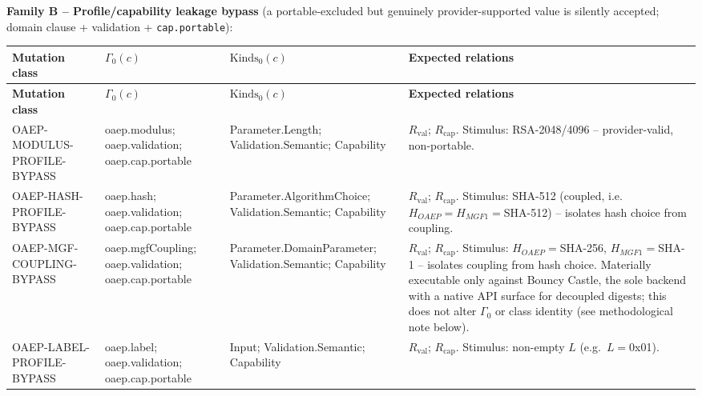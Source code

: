 \documentclass[11pt,a4paper]{article}
\begin{document}
\textbf{Family B -- Profile/capability leakage bypass} (a portable-excluded but genuinely provider-supported value is silently accepted; domain clause + validation + \texttt{cap.portable}):
\begin{longtable}{p{}p{}p{}p{}}
\toprule
\textbf{Mutation class} & \textbf{$\Gamma_0(c)$} & \textbf{$\text{Kinds}_0(c)$} & \textbf{Expected relations}\\
\midrule\endfirsthead
\toprule
\textbf{Mutation class} & \textbf{$\Gamma_0(c)$} & \textbf{$\text{Kinds}_0(c)$} & \textbf{Expected relations}\\
\midrule\endhead
OAEP-MODULUS-PROFILE-BYPASS & oaep.modulus; oaep.validation; oaep.cap.portable & Parameter.Length; Validation.Semantic; Capability & $R_{\text{val}}$; $R_{\text{cap}}$. Stimulus: RSA-2048/4096 -- provider-valid, non-portable.\\
OAEP-HASH-PROFILE-BYPASS & oaep.hash; oaep.validation; oaep.cap.portable & Parameter.AlgorithmChoice; Validation.Semantic; Capability & $R_{\text{val}}$; $R_{\text{cap}}$. Stimulus: SHA-512 (coupled, i.e.\ $H_{OAEP}=H_{MGF1}=$SHA-512) -- isolates hash choice from coupling.\\
OAEP-MGF-COUPLING-BYPASS & oaep.mgfCoupling; oaep.validation; oaep.cap.portable & Parameter.DomainParameter; Validation.Semantic; Capability & $R_{\text{val}}$; $R_{\text{cap}}$. Stimulus: $H_{OAEP}=$SHA-256, $H_{MGF1}=$SHA-1 -- isolates coupling from hash choice. Materially executable only against Bouncy Castle, the sole backend with a native API surface for decoupled digests; this does not alter $\Gamma_0$ or class identity (see methodological note below).\\
OAEP-LABEL-PROFILE-BYPASS & oaep.label; oaep.validation; oaep.cap.portable & Input; Validation.Semantic; Capability & $R_{\text{val}}$; $R_{\text{cap}}$. Stimulus: non-empty $L$ (e.g.\ $L=$0x01).\\
\bottomrule
\end{longtable}
\end{document}
